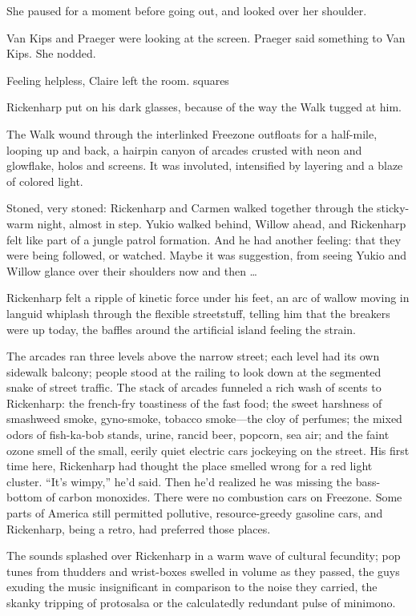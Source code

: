 She paused for a moment before going out, and looked over her shoulder.

Van Kips and Praeger were looking at the screen. Praeger said something to Van Kips. She nodded.

Feeling helpless, Claire left the room.
squares

Rickenharp put on his dark glasses, because of the way the Walk tugged at him.

The Walk wound through the interlinked Freezone outfloats for a half-mile, looping up and back, a hairpin canyon of arcades crusted with neon and glowflake, holos and screens. It was involuted, intensified by layering and a blaze of colored light.

Stoned, very stoned: Rickenharp and Carmen walked together through the sticky-warm night, almost in step. Yukio walked behind, Willow ahead, and Rickenharp felt like part of a jungle patrol formation. And he had another feeling: that they were being followed, or watched. Maybe it was suggestion, from seeing Yukio and Willow glance over their shoulders now and then …

Rickenharp felt a ripple of kinetic force under his feet, an arc of wallow moving in languid whiplash through the flexible streetstuff, telling him that the breakers were up today, the baffles around the artificial island feeling the strain.

The arcades ran three levels above the narrow street; each level had its own sidewalk balcony; people stood at the railing to look down at the segmented snake of street traffic. The stack of arcades funneled a rich wash of scents to Rickenharp: the french-fry toastiness of the fast food; the sweet harshness of smashweed smoke, gyno-smoke, tobacco smoke—the cloy of perfumes; the mixed odors of fish-ka-bob stands, urine, rancid beer, popcorn, sea air; and the faint ozone smell of the small, eerily quiet electric cars jockeying on the street. His first time here, Rickenharp had thought the place smelled wrong for a red light cluster. “It’s wimpy,” he’d said. Then he’d realized he was missing the bass-bottom of carbon monoxides. There were no combustion cars on Freezone. Some parts of America still permitted pollutive, resource-greedy gasoline cars, and Rickenharp, being a retro, had preferred those places.

The sounds splashed over Rickenharp in a warm wave of cultural fecundity; pop tunes from thudders and wrist-boxes swelled in volume as they passed, the guys exuding the music insignificant in comparison to the noise they carried, the skanky tripping of protosalsa or the calculatedly redundant pulse of minimono.

